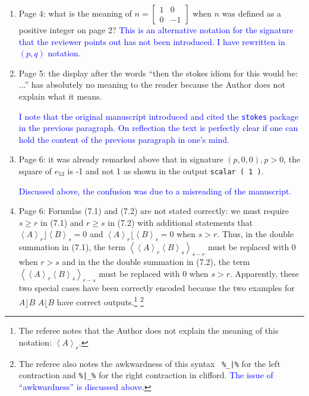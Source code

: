 \documentclass{article}
\begin{document}
\begin{enumerate}
\item Page 4: what is the meaning of
  $n=\left[\begin{array}{cc}1&0\\0&-1\end{array}\right]$ when $n$ was
  defined as a positive integer on page 2?  \textcolor{blue}{This is
    an alternative notation for the signature that the reviewer points
    out has not been introduced.  I have rewritten in $(p,q)$
    notation.}

  \item Page 5: the display after the words
“then the stokes idiom for this would be: ...” has absolutely no
meaning to the reader because the Author does not explain what it
means.

\textcolor{blue}{I note that the original manuscript introduced and
  cited the {\tt stokes} package in the previous paragraph.  On
  reflection the text is perfectly clear if one can hold the content
  of the previous paragraph in one's mind.}

\item Page 6: it was already remarked above that in signature $(p, 0,
  0), p > 0$, the square of $e_{53}$ is -1 and not 1 as shown in the
  output \verb+scalar ( 1 )+.

\textcolor{blue}{Discussed above, the confusion was due to a
  misreading of the manuscript.}

  \item Page 6: Formulas (7.1) and (7.2) are not stated correctly: we
    must require $s\geq r$ in (7.1) and $r \geq s$ in (7.2) with
    additional statements that $\left\langle
    A\right\rangle_r\rfloor\left\langle B\right\rangle_s=0$ and
    $\left\langle A\right\rangle_r\lfloor\left\langle
    B\right\rangle_s=0$ when $s > r$.  Thus, in the double summation
    in (7.1), the term $\left\langle\left\langle
    A\right\rangle_r\left\langle B\right\rangle_s\right\rangle_{s-r}$
    must be replaced with 0 when $r > s$ and in the the double
    summation in (7.2), the term $\left\langle\left\langle
    A\right\rangle_r\left\langle B\right\rangle_s\right\rangle_{r-s}$
    must be replaced with 0 when $s>r$. Apparently, these two special
    cases have been correctly encoded because the two examples for
    $A\rfloor B$ $A\lfloor B$ have correct outputs.\footnote{The referee notes that the Author does not explain the
meaning of this notation: $\left\langle A\right\rangle_r$.}
\footnote{The referee also notes the awkwardness of this syntax {\tt
  \%\_|\%} for the left contraction and {\tt \%|\_\%} for the right
contraction in clifford.\textcolor{blue}{ The issue of ``awkwardness''
  is discussed above.}}


\end{enumerate}
\end{document}
